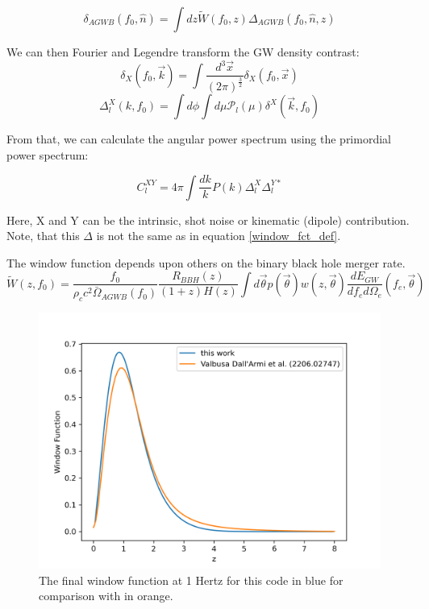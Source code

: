 \begin{equation}
\label{window_fct_def}
    \delta_{AGWB}(f_0, \hat{n})=\int dz \tilde{W}(f_0, z)\Delta_{AGWB}(f_0, \hat{n}, z)
\end{equation}


We can then Fourier and Legendre transform the GW density contrast:
\begin{equation}
    \delta_X(f_0, \vec{k}) = \int \frac{d^3\vec{x}}{(2\pi)^\frac{3}{2}} 
    \delta_X(f_0, \vec{x})
\end{equation}
\begin{equation}
    \Delta_l^X(k, f_0) = \int d\phi \int d\mu \mathcal{P}_l(\mu) 
    \delta^X(\vec{k}, f_0)
\end{equation}

From that, we can calculate the angular power spectrum using the primordial power 
spectrum:

\begin{equation}
    C_l^{XY} = 4\pi \int \frac{dk}{k} P(k) \Delta_l^X \Delta_l^{Y*}
\end{equation}

Here, X and Y can be the intrinsic, shot noise or kinematic (dipole) contribution.
Note, that this $\Delta$ is not the same as in equation \ref{window_fct_def}.

The window function depends upon others on the binary black hole merger rate.
\begin{equation}
\label{window}
    \tilde{W}(z, f_0)=\frac{f_0}{\rho_c c^2 \bar{\Omega}_{AGWB}(f_0)}
    \frac{R_{BBH}(z)}{(1+z)H(z)}\int d\vec{\theta}p(\vec{\theta})
    w(z, \vec{\theta}) \frac{dE_{GW}}{df_e d\Omega_e}(f_e, \vec{\theta})
\end{equation}

\begin{figure}[h]
    \centering
    \includegraphics[width=1\linewidth]{Images/window_comparison.png}
    \caption{The final window function at 1 Hertz for this code in blue for comparison with \cite{dallarmi_dipole_2022} in orange.}
    \label{window_comparison}
\end{figure} 


